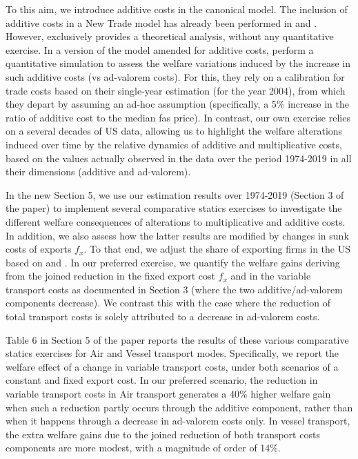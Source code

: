 \documentclass[a4paper,11pt]{article}
\begin{document}
To this aim, we introduce additive costs in the canonical \citet{melitz} model. The inclusion of additive costs in a New Trade model has already been performed in \citet{sorensen2014} and \citet{Irrazabal_2015}. However, \citet{sorensen2014} exclusively provides a theoretical analysis, without any quantitative exercise. In a version of the \citet{chaney2008} model amended for additive costs, \citet{Irrazabal_2015} perform a quantitative simulation to assess the welfare variations induced by the increase in such additive costs (vs ad-valorem costs). For this, they rely on a calibration for trade costs based on their single-year estimation (for the year 2004), from which they depart by assuming an ad-hoc assumption (specifically, a 5\% increase in the ratio of additive cost to the median fas price). In contrast, our own exercise relies on a several decades of US data, allowing us to highlight the welfare alterations induced over time by the relative dynamics of additive and multiplicative costs, based on the values actually observed in the data over the period 1974-2019 in all their dimensions (additive and ad-valorem).\smallskip

In the new Section 5, we use our estimation results over 1974-2019 (Section 3 of the paper) to implement several comparative statics exercises to investigate the different welfare consequences of alterations to multiplicative and additive costs. In addition, we also assess how the latter results are modified by changes in sunk costs of exports $f_{x}$. To that end, we adjust the share of exporting firms in the US based on \citet{BEJK-AER-03} and \citet{Lincoln_McCallum2018}. In our preferred exercise, we quantify the welfare gains deriving from the joined reduction in the fixed export cost $f_x$ and in the variable transport costs as documented in Section 3 (where the two additive/ad-valorem components decrease). We contrast this with the case where the reduction of total transport costs  is solely attributed to a decrease in ad-valorem costs.

Table 6 in Section 5 of the paper reports the results of these various comparative statics exercises for Air and Vessel transport modes. Specifically, we report the welfare effect of a change in variable transport costs, under both scenarios of a constant and fixed export cost. In our preferred scenario, the reduction in variable transport costs in Air transport generates a 40\% higher welfare gain when such a reduction partly
occurs through the additive component, rather than when it happens through a decrease in ad-valorem costs only. In vessel transport, the
extra welfare gains due to the joined reduction of both transport costs components are more modest, with a magnitude of order of 14\%.
\end{document}
